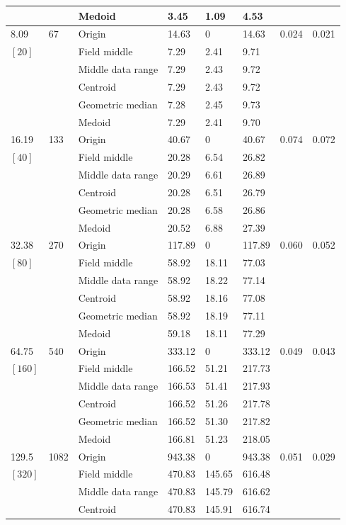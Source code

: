 \documentclass[phd]{ndsu-thesis-2022}
\begin{document}
{{\begin{ThreePartTable}
\begin{longtable}{lll lll ll}
 &  & Medoid  & 3.45 & 1.09 & 4.53 \\
\midrule
8.09 & 67 & Origin  & 14.63 & 0 & 14.63 & 0.024 & 0.021 \\
$[20]$ &  & Field middle  & 7.29 & 2.41 & 9.71 \\
 &  & Middle data range  & 7.29 & 2.43 & 9.72 \\
 &  & Centroid & 7.29 & 2.43 & 9.72 \\
 &  & Geometric median & 7.28 & 2.45 & 9.73 \\
 &  & Medoid  & 7.29 & 2.41 & 9.70 \\ 
\midrule
16.19 & 133 & Origin  & 40.67 & 0 & 40.67 & 0.074 & 0.072 \\
$[40]$ &  & Field middle  & 20.28 & 6.54 & 26.82 \\
 &  & Middle data range  & 20.29 & 6.61 & 26.89 \\
 &  & Centroid & 20.28 & 6.51 & 26.79 \\
 &  & Geometric median & 20.28 & 6.58 & 26.86 \\
 &  & Medoid  & 20.52 & 6.88 & 27.39 \\
\midrule
32.38 & 270 & Origin  & 117.89 & 0 & 117.89 & 0.060 & 0.052 \\
$[80]$ &  & Field middle  & 58.92 & 18.11 & 77.03 \\
 &  & Middle data range  & 58.92 & 18.22 & 77.14 \\
 &  & Centroid & 58.92 & 18.16 & 77.08 \\
 &  & Geometric median & 58.92 & 18.19 & 77.11 \\
 &  & Medoid  & 59.18 & 18.11 & 77.29 \\
\midrule
64.75 & 540 & Origin  & 333.12 & 0 & 333.12 & 0.049 & 0.043 \\
$[160]$ &  & Field middle  & 166.52 & 51.21 & 217.73 \\
 &  & Middle data range  & 166.53 & 51.41 & 217.93 \\
 &  & Centroid & 166.52 & 51.26 & 217.78 \\
 &  & Geometric median & 166.52 & 51.30 & 217.82 \\
 &  & Medoid  & 166.81 & 51.23 & 218.05 \\
\midrule
129.5 & 1082 & Origin  & 943.38 & 0 & 943.38 & 0.051 & 0.029 \\
$[320]$ &  & Field middle  & 470.83 & 145.65 & 616.48 \\
 &  & Middle data range  & 470.83 & 145.79 & 616.62 \\
 &  & Centroid & 470.83 & 145.91 & 616.74 \\

\end{longtable}
\end{ThreePartTable}}}
\end{document}
